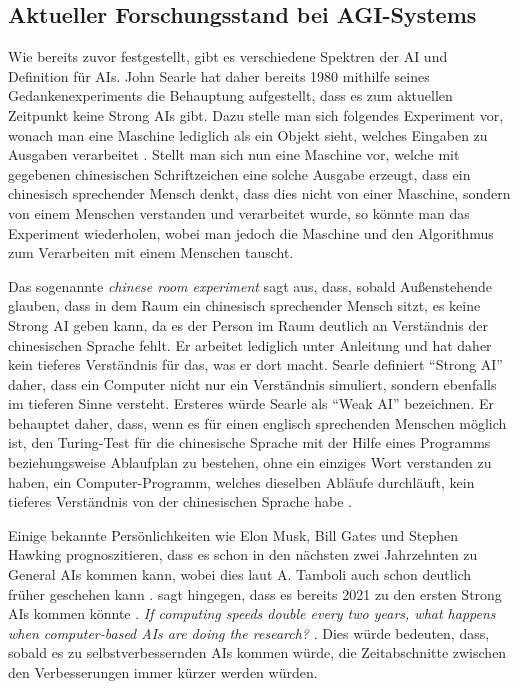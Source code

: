         \subsection{Aktueller Forschungsstand bei AGI-Systems}
            Wie bereits zuvor festgestellt, gibt es verschiedene Spektren der AI und Definition für AIs. John Searle hat
            daher bereits 1980 mithilfe seines Gedankenexperiments die Behauptung aufgestellt, dass es zum aktuellen
            Zeitpunkt keine Strong AIs gibt. Dazu stelle man sich folgendes Experiment vor, wonach man eine Maschine
            lediglich als ein Objekt sieht, welches Eingaben zu Ausgaben verarbeitet \cite{cole_2014}. Stellt man sich
            nun eine Maschine vor, welche mit gegebenen chinesischen Schriftzeichen eine solche Ausgabe erzeugt, dass ein
            chinesisch sprechender Mensch denkt, dass dies nicht von einer Maschine, sondern von einem Menschen verstanden
            und verarbeitet wurde, so könnte man das Experiment wiederholen, wobei man jedoch die Maschine und den
            Algorithmus zum Verarbeiten mit einem Menschen tauscht.

            Das sogenannte \textit{chinese room experiment} sagt aus, dass, sobald Außenstehende glauben,
            dass in dem Raum ein chinesisch sprechender Mensch sitzt, es keine Strong AI geben kann, da es der Person im
            Raum deutlich an Verständnis der chinesischen Sprache fehlt. Er arbeitet lediglich unter
            Anleitung und hat daher kein tieferes Verständnis für das, was er dort macht. Searle definiert
            ``Strong AI'' daher, dass ein Computer nicht nur ein Verständnis simuliert, sondern ebenfalls im tieferen
            Sinne versteht. Ersteres würde Searle als ``Weak AI'' bezeichnen. \cite{cole_2014} Er behauptet daher, dass,
            wenn es für einen englisch sprechenden Menschen möglich ist, den Turing-Test für die chinesische Sprache mit
            der Hilfe eines Programms beziehungsweise Ablaufplan zu bestehen, ohne ein einziges Wort verstanden zu haben,
            ein Computer-Programm, welches dieselben Abläufe durchläuft, kein tieferes Verständnis von der chinesischen
            Sprache habe \cite{cole_2014}.

            Einige bekannte Persönlichkeiten wie Elon Musk, Bill Gates und Stephen Hawking prognoszitieren, dass es
            schon in den nächsten zwei Jahrzehnten zu General AIs kommen kann, wobei dies laut
            A. Tamboli auch schon deutlich früher geschehen kann \cite[s. 20]{Tamboli2019}. \citeauthor{yudkowsky_2001}
            sagt hingegen, dass es bereits 2021 zu den ersten Strong AIs kommen könnte \citeyearpar{yudkowsky_2001}.
            \textit{If computing speeds double every two years, what happens when computer-based AIs are doing the research?}
            \cite{yudkowsky_2001}. Dies würde bedeuten, dass, sobald es zu selbstverbessernden AIs kommen würde, die
            Zeitabschnitte zwischen den Verbesserungen immer kürzer werden würden.

